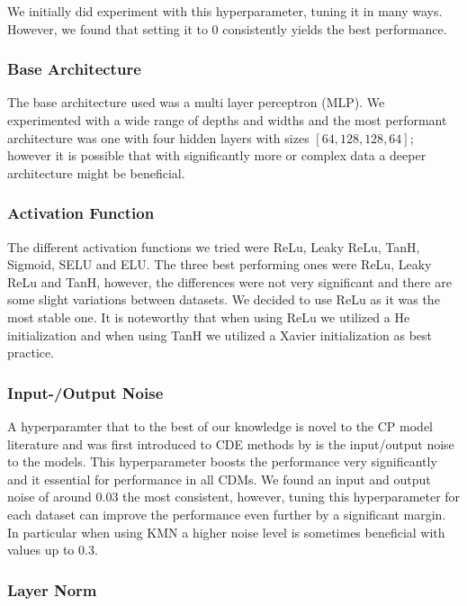 We initially did experiment with this hyperparameter, tuning it in many ways. However, we found that setting it to $0$ consistently yields the best performance.

\subsubsection{Base Architecture}

The base architecture used was a multi layer perceptron (MLP). We experimented with a wide range of depths and widths and the most performant architecture was one with four hidden layers with sizes $[64, 128, 128, 64]$; however it is possible that with significantly more or complex data a deeper architecture might be beneficial.

\subsubsection{Activation Function}

The different activation functions we tried were ReLu, Leaky ReLu, TanH, Sigmoid, SELU and ELU. The three best performing ones were ReLu, Leaky ReLu and TanH, however, the differences were not very significant and there are some slight variations between datasets. We decided to use ReLu as it was the most stable one. It is noteworthy that when using ReLu we utilized a He initialization and when using TanH we utilized a Xavier initialization as best practice.

\subsubsection{Input-/Output Noise}

A hyperparamter that to the best of our knowledge is novel to the CP model literature and was first introduced to CDE methods by \cite{rothfuss2019noise} is the input/output noise to the models. This hyperparameter boosts the performance very significantly and it essential for performance in all CDMs. We found an input and output noise of around $0.03$ the most consistent, however, tuning this hyperparameter for each dataset can improve the performance even further by a significant margin. In particular when using KMN a higher noise level is sometimes beneficial with values up to $0.3$.

\subsubsection{Layer Norm}

